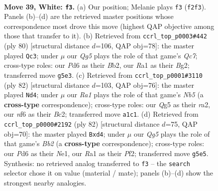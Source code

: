 \documentclass[11pt]{article}
\begin{document}
\clearpage

\begin{figure}[p]\centering
\begin{subfigure}{0.46\textwidth}\centering
\resizebox{\linewidth}{!}{%
\newchessgame
\chessboard[
  setfen={3q1k2/1b1n1p2/3P1n2/2p3Qp/p5pP/6P1/PB3P2/R5K1 w - - 2 39},
  showmover=false,
  pgfstyle=straightmove, color=movearrow, markmove={f2-f3}
]}
\caption{}
\end{subfigure}\hfill
\begin{subfigure}{0.46\textwidth}\centering
\resizebox{\linewidth}{!}{%
\newchessgame
\chessboard[
  setfen={8/ppQbq3/3p3k/3P1np1/1P2p3/P3P2P/1B3KB1/8 w - - 1 41},
  showmover=false,
  pgfstyle=straightmove, color=movearrow, markmove={c7-c3}
]}
\caption{}
\end{subfigure}
\\[4pt]
\begin{subfigure}{0.46\textwidth}\centering
\resizebox{\linewidth}{!}{%
\newchessgame
\chessboard[
  setfen={6k1/3nqp2/5np1/1N1P2Q1/1Pp5/2P4P/r1B2RK1/8 w - - 5 42},
  showmover=false,
  pgfstyle=straightmove, color=movearrow, markmove={b5-d4}
]}
\caption{}
\end{subfigure}\hfill
\begin{subfigure}{0.46\textwidth}\centering
\resizebox{\linewidth}{!}{%
\newchessgame
\chessboard[
  setfen={6k1/4qpp1/Ppn5/3Qp2p/1p1nP3/6Pb/1B2BP1P/4N1K1 w - - 5 42},
  showmover=false,
  pgfstyle=straightmove, color=movearrow, markmove={b2-d4}
]}
\caption{}
\end{subfigure}
\caption{\textbf{Move 39, White: \texttt{f3}.} (a) Our position; Melanie plays \texttt{f3} (\texttt{f2f3}). Panels (b)--(d) are the retrieved master positions whose correspondence most drove this move (highest QAP objective among those that transfer to it). (b) Retrieved from \texttt{ccrl\_top\_p0003\#442} (ply 80) [structural distance $d$=106, QAP obj=78]: the master played \texttt{Qc3}; under $\mu$ our \emph{Qg5} plays the role of that game's \emph{Qc7}; cross-type roles: our \emph{P}d6 as their \emph{B}b2, our \emph{R}a1 as their \emph{B}g2; transferred move \texttt{g5e3}. (c) Retrieved from \texttt{ccrl\_top\_p0001\#3110} (ply 82) [structural distance $d$=103, QAP obj=76]: the master played \texttt{Nd4}; under $\mu$ our \emph{Ra1} plays the role of that game's \emph{Nb5} (a \textbf{cross-type} correspondence); cross-type roles: our \emph{Q}g5 as their \emph{r}a2, our \emph{n}f6 as their \emph{B}c2; transferred move \texttt{a1c1}. (d) Retrieved from \texttt{ccrl\_top\_p0000\#2192} (ply 82) [structural distance $d$=75, QAP obj=70]: the master played \texttt{Bxd4}; under $\mu$ our \emph{Qg5} plays the role of that game's \emph{Bb2} (a \textbf{cross-type} correspondence); cross-type roles: our \emph{P}d6 as their \emph{N}e1, our \emph{R}a1 as their \emph{P}f2; transferred move \texttt{g5e5}. Synthesis: no retrieved analog transferred to \texttt{f3} -- the \texttt{search} selector chose it on value (material / mate); panels (b)--(d) show the strongest nearby analogies.}
\label{fig:thought-m76}
\end{figure}
\end{document}
